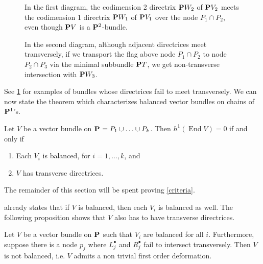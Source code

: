 \documentclass[11pt, two side, letterpaper, final]{amsart}
\renewcommand{\P}{{\bf P}}
\DeclareMathOperator{\End}{End}
\newcommand{\chain}[1]{\P_{#1}}
\begin{document}
\begin{figure}
\begin{center}
{In the first diagram, the codimension 2 directrix $\P W_2$ of $\P V_2$ meets the codimension 1 directrix $\P W_1$ of $\P V_1$
over the node $P_1 \cap P_2$, even though $\P V$ is a $\P^2$-bundle.   

In the second diagram, although adjacent directrices meet transversely, if we transport the flag above node
 $P_1 \cap P_2$ to node $P_2 \cap P_3$ via the minimal subbundle $\P T$, we get non-transverse intersection with
 $\P W_3$. 
}
\label{figure:transverse-directrices}
\end{center}
\end{figure}


See \cref{figure:transverse-directrices} for examples of bundles whose directrices fail to meet transversely. We can now state the theorem which characterizes balanced vector bundles on chains of $\P^{1}$'s.

\begin{theorem}\label{criteria}
Let $V$ be a vector bundle on $\chain{} = P_{1} \cup  \ldots \cup P_{k}$.  Then  $h^{1}(\End V) = 0$ if and only if 
\begin{enumerate}
\item \label{criteria:cond1} Each $V_i$ is balanced, for $i = 1, \ldots, k$, and
\item \label{criteria:cond2} $V$ has transverse directrices. 
\end{enumerate}
\end{theorem}

The remainder of this section will be spent proving \cref{criteria}.


 already states that if $V$ is balanced, 
then each $V_i$ is balanced as well. The following proposition shows that $V$ also has to have 
transverse directrices.

\begin{proposition}\label{deform}
Let $V$ be a vector bundle on $\chain{}$ such that $V_{i}$ are balanced for all $i$. Furthermore, suppose there is a node $p_{j}$  where $L^{\bullet}_{j}$ and $R^{\bullet}_{j}$ fail to intersect transversely.  Then $V$ is not balanced, i.e. $V$ admits a non trivial first order deformation.
\end{proposition}
\end{document}
